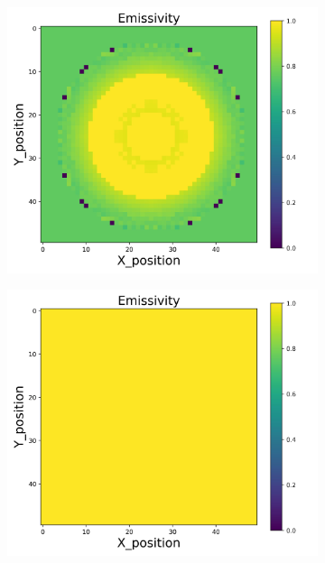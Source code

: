 \begin{figure}[p]
    \centering
    \begin{minipage}{\textwidth}
        \centering
        \begin{subfigure}{0.325\textwidth}
            \centering
            \includegraphics[width=\textwidth]{figures/raw_data/0/quad/emi_cal.jpg}
        \end{subfigure}
        \begin{subfigure}{0.325\textwidth}
            \centering
            \includegraphics[width=\textwidth]{figures/raw_data/5/quad/emi_cal.jpg}

\end{subfigure}
\end{minipage}
\end{figure}
